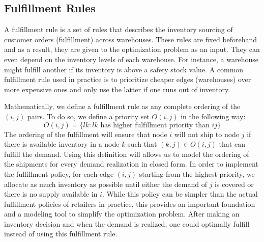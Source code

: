 \documentclass[poms,final,blindrev]{poms1_V1} %
\begin{document}
\subsection{Fulfillment Rules}
\label{sec:fulfilment-rules}

A fulfillment rule is a set of rules that describes the inventory sourcing of customer orders (fulfillment) across warehouses. 
These rules are fixed beforehand and as a result, they are given to the optimization problem as an input. They can even depend on the inventory levels of each warehouse. For instance, a warehouse might fulfill another if its inventory is above a safety stock value.
A common fulfillment rule used in practice is to prioritize cheaper edges (warehouses) over more expensive ones and only use the latter if one runs out of inventory. 

Mathematically, we define a fulfillment rule as any complete ordering of the $(i,j)$ pairs. To do so, we define a priority set $O(i,j)$ in the following way:
\begin{equation}
\label{definition-O}
O({i,j}) = \{{lk}: lk \text{ has higher fulfillment priority than } ij  \}
\end{equation}
The ordering of the fulfillment will ensure that node $i$ will not ship to node $j$ if there is available inventory in a node $k$ such that $(k,j) \in O({i,j})$ that can fulfill the demand. Using this definition will allows us to model the ordering of the shipments for every demand realization in closed form. In order to implement the fulfillment policy, for each edge $(i,j)$ starting from the highest priority, we allocate as much inventory as possible until either the demand of $j$ is covered or there is no supply available in $i$. While this policy can be simpler than the actual fulfillment policies of retailers in practice, this provides an important foundation and a modeling tool to simplify the optimization problem. After making an inventory decision and when the demand is realized, one could optimally fulfill instead of using this fulfillment rule.

\end{document}
